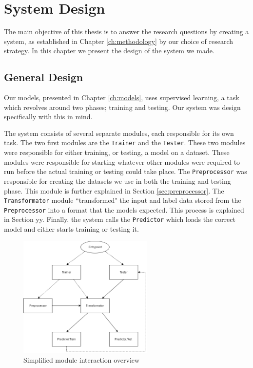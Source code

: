 
\chapter{System Design}
\label{ch:system_design}
The main objective of this thesis is to answer the research questions by creating a system, as established in Chapter \ref{ch:methodology} by our choice of research strategy. In this chapter we present the design of the system we made. 


\section{General Design}
Our models, presented in Chapter \ref{ch:models}, uses supervised learning, a task which revolves around two phases; training and testing. Our system was design specifically with this in mind.

The system consists of several separate modules, each responsible for its own task. The two first modules are the {\tt Trainer} and the {\tt Tester}. These two modules were responsible for either training, or testing, a model on a dataset. These modules were responsible for starting whatever other modules were required to run before the actual training or testing could take place. The {\tt Preprocessor} was responsible for creating the datasets we use in both the training and testing phase. This module is further explained in Section \ref{sec:preprocessor}. The {\tt Transformator} module ``transformed" the input and label data stored from the {\tt Preprocessor} into a format that the models expected. This process is explained in Section yy. Finally, the system calls the {\tt Predictor} which loads the correct model and either starts training or testing it.

\begin{figure}[ht]
    \centering
    \includegraphics[width=0.6\textwidth]{fig/system_design/system_design.png}
    \caption{Simplified module interaction overview}
    \label{fig:system-design}
\end{figure}

